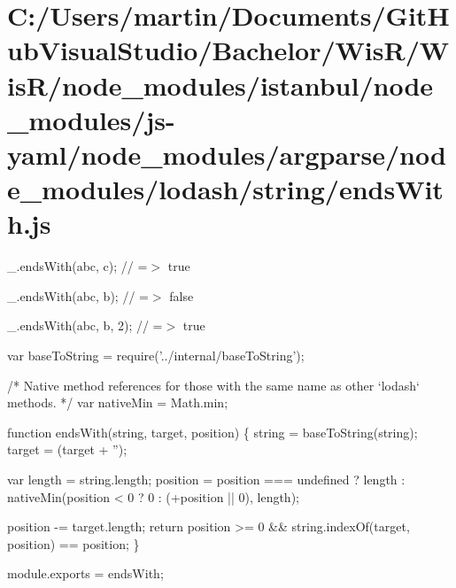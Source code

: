 \hypertarget{_c_1_2_users_2martin_2_documents_2_git_hub_visual_studio_2_bachelor_2_wis_r_2_wis_r_2node_module0d86c3e426571faf0a0c1565f7a1c066}{}\section{C\+:/\+Users/martin/\+Documents/\+Git\+Hub\+Visual\+Studio/\+Bachelor/\+Wis\+R/\+Wis\+R/node\+\_\+modules/istanbul/node\+\_\+modules/js-\/yaml/node\+\_\+modules/argparse/node\+\_\+modules/lodash/string/ends\+With.\+js}
\+\_\+.\+ends\+With(\textquotesingle{}abc\textquotesingle{}, \textquotesingle{}c\textquotesingle{}); // =$>$ true

\+\_\+.\+ends\+With(\textquotesingle{}abc\textquotesingle{}, \textquotesingle{}b\textquotesingle{}); // =$>$ false

\+\_\+.\+ends\+With(\textquotesingle{}abc\textquotesingle{}, \textquotesingle{}b\textquotesingle{}, 2); // =$>$ true


\begin{DoxyCodeInclude}
var baseToString = require(\textcolor{stringliteral}{'../internal/baseToString'});

\textcolor{comment}{/* Native method references for those with the same name as other `lodash` methods. */}
var nativeMin = Math.min;

\textcolor{keyword}{function} endsWith(\textcolor{keywordtype}{string}, target, position) \{
  \textcolor{keywordtype}{string} = baseToString(\textcolor{keywordtype}{string});
  target = (target + \textcolor{stringliteral}{''});

  var length = \textcolor{keywordtype}{string}.length;
  position = position === undefined
    ? length
    : nativeMin(position < 0 ? 0 : (+position || 0), length);

  position -= target.length;
  \textcolor{keywordflow}{return} position >= 0 && \textcolor{keywordtype}{string}.indexOf(target, position) == position;
\}

module.exports = endsWith;
\end{DoxyCodeInclude}
 